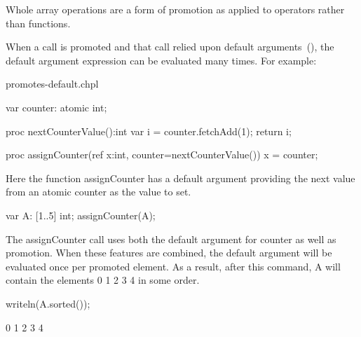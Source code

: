 
Whole array operations are a form of promotion as applied to operators
rather than functions.

When a call is promoted and that call relied upon default
arguments~(), the default argument expression can
be evaluated many times. For example:

\begin{chapelexample}{promotes-default.chpl}
\begin{chapel}
  var counter: atomic int;

  proc nextCounterValue():int {
    var i = counter.fetchAdd(1);
    return i;
  }

  proc assignCounter(ref x:int, counter=nextCounterValue()) {
    x = counter;
  }
\end{chapel}

Here the function assignCounter has a default argument
providing the next value from an atomic counter as the value to set.

\begin{chapel}
  var A: [1..5] int;
  assignCounter(A);
\end{chapel}

The assignCounter call uses both the default argument for counter as well
as promotion. When these features are combined, the default argument
will be evaluated once per promoted element. As a result, after this
command, A will contain the elements 0 1 2 3 4 in some order.

\begin{chapelnoprint}
writeln(A.sorted());
\end{chapelnoprint}
\begin{chapeloutput}
0 1 2 3 4
\end{chapeloutput}
\end{chapelexample}



